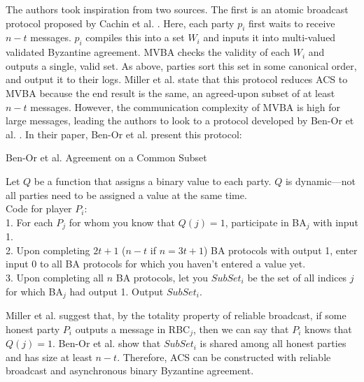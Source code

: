 \documentclass{article}
\begin{document}
The authors took inspiration from two sources. The first is an atomic broadcast protocol proposed by Cachin et al. \cite{cachin2001secure}. Here, each party $p_i$ first waits to receive $n - t$ messages. $p_i$ compiles this into a set $W_i$ and inputs it into multi-valued validated Byzantine agreement. MVBA checks the validity of each $W_i$ and outputs a single, valid set. As above, parties sort this set in some canonical order, and output it to their logs. Miller et al. state that this protocol reduces ACS to MVBA because the end result is the same, an agreed-upon subset of at least $n - t$ messages. However, the communication complexity of MVBA is high for large messages, leading the authors to look to a protocol developed by Ben-Or et al. \cite{ben1994asynchronous}. In their paper, Ben-Or et al. present this protocol:

\begin{algorithm}\label{ben-or-prot}
\caption{Ben-Or et al. Agreement on a Common Subset \cite{ben1994asynchronous}}



Let $Q$ be a function that assigns a binary value to each party. $Q$ is dynamic---not all parties need to be assigned a value at the same time.\\
Code for player $P_i$:\\
1. For each $P_j$ for whom you know that $Q(j) = 1$, participate in BA$_j$ with input 1.\\
2. Upon completing $2t+1$ ($n - t$ if $n = 3t + 1$) BA protocols with output 1, enter input 0 to all BA protocols for which you haven't entered a value yet.\\
3. Upon completing all $n$ BA protocols, let you $SubSet_i$ be the set of all indices $j$ for which BA$_j$ had output 1. Output $SubSet_i$.

\SetAlgoLined
\SetAlgoNoEnd
\end{algorithm}

Miller et al. suggest that, by the totality property of reliable broadcast, if some honest party $P_i$ outputs a message in RBC$_j$, then we can say that $P_i$ knows that $Q(j) = 1$. Ben-Or et al. show that $SubSet_i$ is shared among all honest parties and has size at least $n - t$. Therefore, ACS can be constructed with reliable broadcast and asynchronous binary Byzantine agreement.
\end{document}
